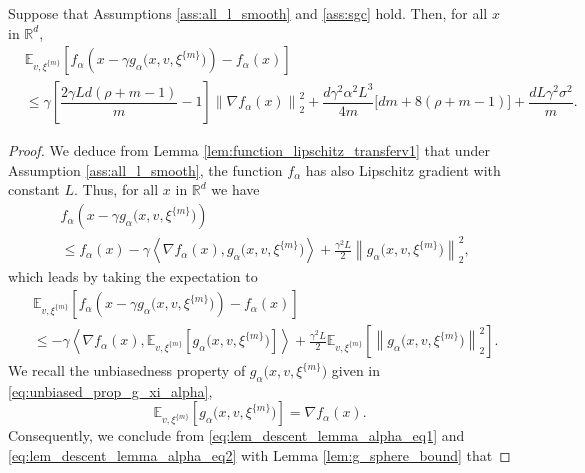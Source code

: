 \documentclass[10pt,a4paper]{amsart}
\newcommand{\Ec}[2]{\mathbb{E}_{#2}\left[#1 \right]}
\def\R{{\mathbb{R}}}
\newcommand{\dotprod}[1]{\left< #1\right>}
\def\gest{{g_\alpha}}
\newcommand{\norm}[1]{\left\lVert#1\right\rVert_{2}}
\def\xiest{{\xi^{\{m\}}}}
\begin{document}
\begin{lemma}\label{lem:descent_lemma_alpha}
Suppose that Assumptions \ref{ass:all_l_smooth} and \ref{ass:sgc} hold. Then, for all $x$ in $\R^d$,
\begin{equation*}
    \begin{aligned}
        &\Ec{f_\alpha\left(x - \gamma g_{\alpha}\Big(x,v,\xiest\Big)\right) - f_\alpha(x)}{v,\xiest}\\
        &\leq \gamma\left[\dfrac{2\gamma Ld(\rho+m-1)}{m}-1\right]\norm{\nabla f_\alpha(x)}^2+\dfrac{d\gamma^2\alpha^2L^3}{4m}\Big[dm+8(\rho+m-1)\Big]+\dfrac{dL\gamma^2\sigma^2}{m}.
    \end{aligned}
\end{equation*}
\end{lemma}

\begin{proof}
We deduce from Lemma \ref{lem:function_lipschitz_transferv1} that under Assumption \ref{ass:all_l_smooth}, the function $f_\alpha$ has also Lipschitz gradient with constant $L$. Thus, %
for all $x$ in $\R^d$ we have
\begin{equation*}
    \begin{aligned}
        &f_\alpha\left(x - \gamma g_{\alpha}\Big(x,v,\xiest\Big)\right)  \\
        &\leq f_\alpha(x) -\gamma\dotprod{\nabla f_{\alpha}(x), g_{\alpha}\Big(x,v,\xiest\Big)} + \frac{\gamma^2 L}{2}\norm{g_{\alpha}\Big(x,v,\xiest\Big)}^2,
    \end{aligned}
\end{equation*}
which leads by taking the expectation to
\begin{equation}\label{eq:lem_descent_lemma_alpha_eq1}
    \begin{aligned}
    &\Ec{f_\alpha\left(x - \gamma g_{\alpha}\Big(x,v,\xiest\Big)\right) - f_\alpha(x)}{v,\xiest}\\
    &\leq  -\gamma\dotprod{\nabla f_{\alpha}(x), \Ec{g_{\alpha}\Big(x,v,\xiest\Big)}{v,\xiest}} + \frac{\gamma^2 L}{2}\Ec{\norm{g_{\alpha}\Big(x,v,\xiest\Big)}^2}{v,\xiest}.
\end{aligned}
\end{equation}
We recall the unbiasedness property of $\gest\Big(x,v,\xiest\Big)$ given in \eqref{eq:unbiased_prop_g_xi_alpha},
\begin{equation}\label{eq:lem_descent_lemma_alpha_eq2}
    \Ec{g_{\alpha}\Big(x,v,\xiest\Big)}{v,\xiest}=\nabla f_{\alpha}(x).
\end{equation}
Consequently, we conclude from \eqref{eq:lem_descent_lemma_alpha_eq1} and \eqref{eq:lem_descent_lemma_alpha_eq2} with Lemma \ref{lem:g_sphere_bound} that

\end{proof}
\end{document}
